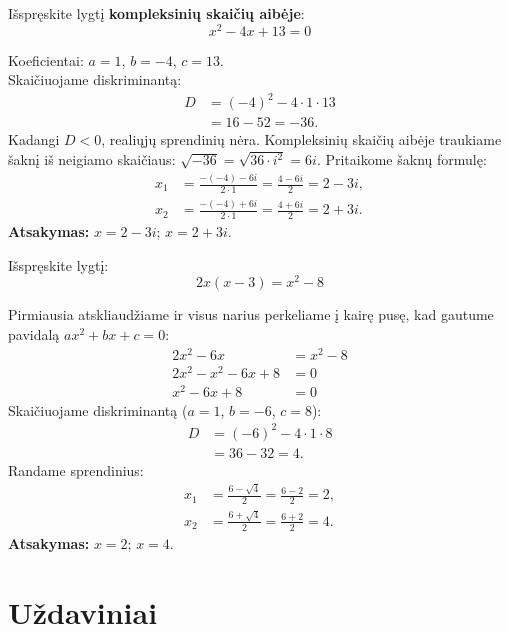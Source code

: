 \documentclass[11pt,a4paper]{scrartcl}
\begin{document}
\begin{example}
Išspręskite lygtį \textbf{kompleksinių skaičių aibėje}:
\[ x^2 - 4x + 13 = 0 \]
\end{example}
\begin{solution}
Koeficientai: $a=1$, $b=-4$, $c=13$.\\
Skaičiuojame diskriminantą:
\[
\begin{aligned}
D &= (-4)^2 - 4 \cdot 1 \cdot 13 \\
&= 16 - 52 = -36.
\end{aligned}
\]
Kadangi $D < 0$, realiųjų sprendinių nėra. Kompleksinių skaičių aibėje traukiame šaknį iš neigiamo skaičiaus: $\sqrt{-36} = \sqrt{36 \cdot i^2} = 6i$.
Pritaikome šaknų formulę:
\[
\begin{aligned}
x_1 &= \frac{-(-4) - 6i}{2 \cdot 1} = \frac{4 - 6i}{2} = 2 - 3i, \\
x_2 &= \frac{-(-4) + 6i}{2 \cdot 1} = \frac{4 + 6i}{2} = 2 + 3i.
\end{aligned}
\]
\textbf{Atsakymas:} $x=2-3i$; $x=2+3i$.
\end{solution}

\begin{example}
Išspręskite lygtį:
\[ 2x(x - 3) = x^2 - 8 \]
\end{example}
\begin{solution}
Pirmiausia atskliaudžiame ir visus narius perkeliame į kairę pusę, kad gautume pavidalą $ax^2+bx+c=0$:
\[
\begin{aligned}
2x^2 - 6x &= x^2 - 8 \\
2x^2 - x^2 - 6x + 8 &= 0 \\
x^2 - 6x + 8 &= 0
\end{aligned}
\]
Skaičiuojame diskriminantą ($a=1$, $b=-6$, $c=8$):
\[
\begin{aligned}
D &= (-6)^2 - 4 \cdot 1 \cdot 8 \\
&= 36 - 32 = 4.
\end{aligned}
\]
Randame sprendinius:
\[
\begin{aligned}
x_1 &= \frac{6 - \sqrt{4}}{2} = \frac{6 - 2}{2} = 2, \\
x_2 &= \frac{6 + \sqrt{4}}{2} = \frac{6 + 2}{2} = 4.
\end{aligned}
\]
\textbf{Atsakymas:} $x=2$; $x=4$.
\end{solution}

\newpage
\section{Uždaviniai}
\end{document}
